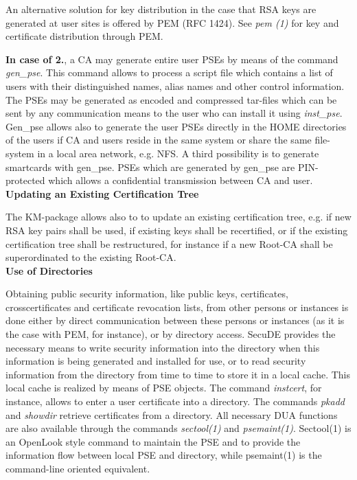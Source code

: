 An alternative solution for key distribution in the case that RSA keys are generated
at user sites is offered by PEM (RFC 1424). See {\em pem (1)} for key and certificate
distribution through PEM. 

{\bf In case of 2.}, a CA may generate entire user PSEs by means of the command
{\em gen\_pse}. This command allows to process a script file which contains
a list of users with their distinguished names, alias names and other control
information. The PSEs may be generated as encoded and compressed tar-files which can
be sent by any communication means to the user who can install it using {\em inst\_pse}. 
Gen\_pse allows also to generate
the user PSEs directly in the HOME directories of the users if CA and users reside
in the same system or share the same file-system in a local area network, e.g. NFS.
A third possibility is to generate smartcards with gen\_pse. PSEs which are generated
by gen\_pse are PIN-protected which allows a confidential transmission between
CA and user. 
\\ [1em]
{\bf Updating an Existing Certification Tree}

The KM-package allows also to 
to update an existing certification tree, e.g. if new RSA key pairs shall be used,
if existing keys shall be recertified, or if the existing certification tree shall be 
restructured, for instance if a new Root-CA shall be superordinated to the 
existing Root-CA.
\\ [1em]
{\bf Use of Directories} 
 
Obtaining public security information, like public keys, certificates,
crosscertificates and certificate revocation lists, from other persons or instances is
done either by direct communication between these persons or instances (as it
is the case with PEM, for instance), or by directory access. SecuDE provides the
necessary means to write security information into the directory when this
information is being generated and installed for use, or to read security
information from the directory from time to time to store it in a local cache.
This local cache is realized by means of PSE objects. 
The command {\em instcert}, for instance, allows to enter a user
certificate into a directory. The commands {\em pkadd} and {\em showdir}
retrieve certificates from a directory. All necessary DUA functions are
also available through the commands {\em sectool(1)} and {\em psemaint(1)}.
Sectool(1) is an OpenLook style command to maintain the PSE and to provide
the information flow between local PSE and directory, while psemaint(1) is the 
command-line oriented equivalent.

